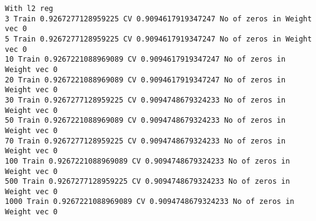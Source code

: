 \documentclass[11pt]{article}
\begin{document}
    \begin{Verbatim}[commandchars=\\\{\}]
With l2 reg
3 Train 0.9267277128959225 CV 0.9094617919347247 No of zeros in Weight vec 0
5 Train 0.9267277128959225 CV 0.9094617919347247 No of zeros in Weight vec 0
10 Train 0.9267221088969089 CV 0.9094617919347247 No of zeros in Weight vec 0
20 Train 0.9267221088969089 CV 0.9094617919347247 No of zeros in Weight vec 0
30 Train 0.9267277128959225 CV 0.9094748679324233 No of zeros in Weight vec 0
50 Train 0.9267221088969089 CV 0.9094748679324233 No of zeros in Weight vec 0
70 Train 0.9267277128959225 CV 0.9094748679324233 No of zeros in Weight vec 0
100 Train 0.9267221088969089 CV 0.9094748679324233 No of zeros in Weight vec 0
500 Train 0.9267277128959225 CV 0.9094748679324233 No of zeros in Weight vec 0
1000 Train 0.9267221088969089 CV 0.9094748679324233 No of zeros in Weight vec 0

    \end{Verbatim}
\end{document}
